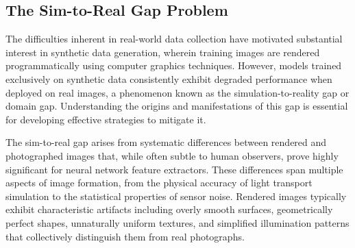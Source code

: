 \subsection{The Sim-to-Real Gap Problem}
\label{subsec:sim_to_real_gap}

The difficulties inherent in real-world data collection have motivated substantial interest in synthetic data generation, wherein training images are rendered programmatically using computer graphics techniques. However, models trained exclusively on synthetic data consistently exhibit degraded performance when deployed on real images, a phenomenon known as the simulation-to-reality gap or domain gap. Understanding the origins and manifestations of this gap is essential for developing effective strategies to mitigate it.

The sim-to-real gap arises from systematic differences between rendered and photographed images that, while often subtle to human observers, prove highly significant for neural network feature extractors. These differences span multiple aspects of image formation, from the physical accuracy of light transport simulation to the statistical properties of sensor noise. Rendered images typically exhibit characteristic artifacts including overly smooth surfaces, geometrically perfect shapes, unnaturally uniform textures, and simplified illumination patterns that collectively distinguish them from real photographs.


